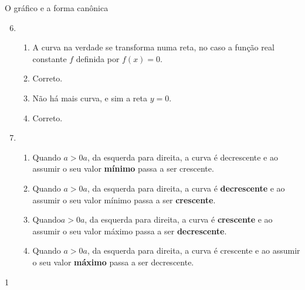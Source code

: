 \begin{answer}{O gráfico e a forma canônica}
{
\begin{enumerate}\setcounter{enumi}{5}
\item {} 
\begin{enumerate}[label=\titem{\roman*)}]
\item A curva na verdade se transforma numa reta, no caso a função real constante \(f\) definida por \(f(x)=0\).

\item Correto.

\item Não há mais curva, e sim a reta \(y=0\).

\item Correto.
\end{enumerate}

\item {} 
\begin{enumerate}[label=\titem{\roman*)}]
\item Quando $a>0a$, da esquerda para direita, a curva é decrescente e ao assumir o seu valor \textbf{mínimo} passa a ser crescente.

\item Quando $a>0a$, da esquerda para direita, a curva é \textbf{decrescente} e ao assumir o seu valor mínimo passa a ser \textbf{crescente}.

\item Quando$a>0a$, da esquerda para direita, a curva é \textbf{crescente} e ao assumir o seu valor máximo passa a ser \textbf{decrescente}.

\item Quando $a>0a$, da esquerda para direita, a curva é crescente e ao assumir o seu valor \textbf{máximo} passa a ser decrescente.
\end{enumerate}
\end{enumerate}
}{1}
\end{answer}
\clearmargin

